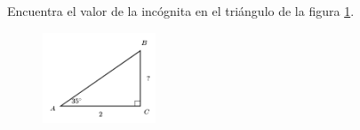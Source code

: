 Encuentra el valor de la incógnita en el triángulo de la figura \ref{fig:lados_functrig_23}.
\begin{figure}[H]
    \begin{center}
        \includegraphics[width=0.3\textwidth]{../images/lados_functrig_23.png}
    \end{center}
    \caption{}
    \label{fig:lados_functrig_23}
\end{figure}